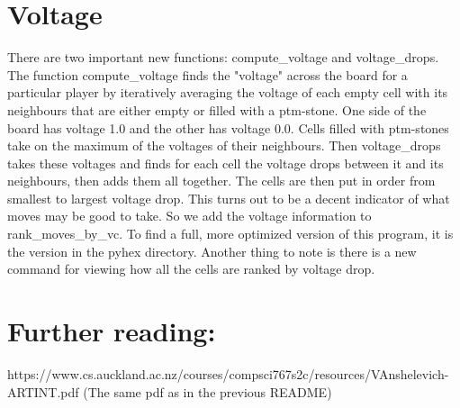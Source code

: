 \documentclass{article}
\begin{document}
\section*{Voltage}
There are two important new functions: compute\_voltage and voltage\_drops. The function compute\_voltage finds the "voltage" across the board for a particular player by iteratively averaging the voltage of each empty cell with its neighbours that are either empty or filled with a ptm-stone. One side of the board has voltage 1.0 and the other has voltage 0.0. Cells filled with ptm-stones take on the maximum of the voltages of their neighbours. Then voltage\_drops takes these voltages and finds for each cell the voltage drops between it and its neighbours, then adds them all together. The cells are then put in order from smallest to largest voltage drop. This turns out to be a decent indicator of what moves may be good to take. So we add the voltage information to rank\_moves\_by\_vc. To find a full, more optimized version of this program, it is the version in the pyhex directory. Another thing to note is there is a new command for viewing how all the cells are ranked by voltage drop.
\section*{Further reading:}
	https://www.cs.auckland.ac.nz/courses/compsci767s2c/resources/VAnshelevich-ARTINT.pdf (The same pdf as in the previous README)
\end{document}
